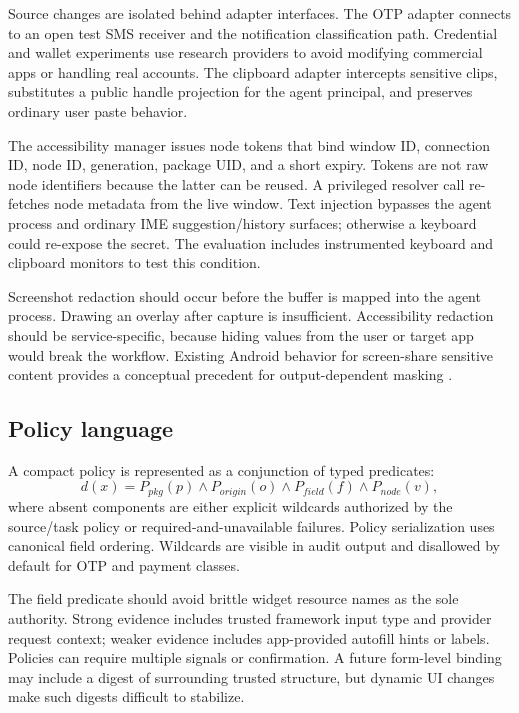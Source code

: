 Source changes are isolated behind adapter interfaces. The OTP adapter connects to an open test SMS receiver and the notification classification path. Credential and wallet experiments use research providers to avoid modifying commercial apps or handling real accounts. The clipboard adapter intercepts sensitive clips, substitutes a public handle projection for the agent principal, and preserves ordinary user paste behavior.

The accessibility manager issues node tokens that bind window ID, connection ID, node ID, generation, package UID, and a short expiry. Tokens are not raw node identifiers because the latter can be reused. A privileged resolver call re-fetches node metadata from the live window. Text injection bypasses the agent process and ordinary IME suggestion/history surfaces; otherwise a keyboard could re-expose the secret. The evaluation includes instrumented keyboard and clipboard monitors to test this condition.

Screenshot redaction should occur before the buffer is mapped into the agent process. Drawing an overlay after capture is insufficient. Accessibility redaction should be service-specific, because hiding values from the user or target app would break the workflow. Existing Android behavior for screen-share sensitive content provides a conceptual precedent for output-dependent masking \cite{android15privacy}.

\subsection{Policy language}

A compact policy is represented as a conjunction of typed predicates:
\begin{equation}
d(x)=P_{pkg}(p)\land P_{origin}(o)\land P_{field}(f)\land P_{node}(v),
\label{eq:policy}
\end{equation}
where absent components are either explicit wildcards authorized by the source/task policy or required-and-unavailable failures. Policy serialization uses canonical field ordering. Wildcards are visible in audit output and disallowed by default for OTP and payment classes.

The field predicate should avoid brittle widget resource names as the sole authority. Strong evidence includes trusted framework input type and provider request context; weaker evidence includes app-provided autofill hints or labels. Policies can require multiple signals or confirmation. A future form-level binding may include a digest of surrounding trusted structure, but dynamic UI changes make such digests difficult to stabilize.

